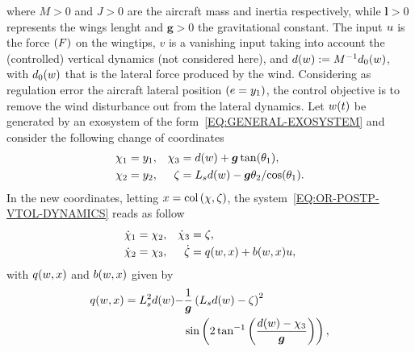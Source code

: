 where $M>0$ and $J>0$ are the aircraft mass and inertia respectively, while $\boldsymbol{l}>0$ represents the wings lenght and $\boldsymbol{g} > 0$ the
gravitational constant. The input $u$ is the force $\left( F \right)$ on the wingtips, $v$ is a vanishing input taking into
account the (controlled) vertical dynamics (not considered here), and $d(w) := M^{-1}d_0(w)$, with $d_0(w)$ that is
the lateral force produced by the wind. Considering as regulation error the aircraft lateral position $\left( e = y_1\right)$, the control
objective is to remove the wind disturbance out from the lateral dynamics.
Let $w(t)$ be generated by an exosystem of the form~\eqref{EQ:GENERAL-EXOSYSTEM} and consider the following change of coordinates
\begin{equation*}
   \begin{matrix}
      \begin{split}
        \chi_1 & = y_1, \\ \chi_2 & = y_2,
      \end{split} &
      \begin{split}
        \chi_3 & = d(w) + \boldsymbol{g} \tan(\theta_1), \\ \zeta & = L_s d(w) - {\boldsymbol{g} \theta_2}/{\cos(\theta_1)}.
      \end{split}
   \end{matrix}
\end{equation*}
In the new coordinates, letting $x = \text{col} \left( {\chi, \zeta} \right)$, the system~\eqref{EQ:OR-POSTP-VTOL-DYNAMICS} reads as follow
\begin{equation}%
   \label{EQ:OR-POSTP-NEW-VTOL-SYSTEM}
   \begin{matrix}
      \begin{split}
         \dot{\chi}_1 & = \chi_2, \\
         \dot{\chi}_2 & = \chi_3,
      \end{split} &
      \begin{split}
         \dot{\chi}_3 & = \zeta, \\
      \dot{\zeta} & = \qfun(\ww,\xx) + \bfun(\ww,\xx)\uu,
      \end{split}
   \end{matrix}
\end{equation}
with $q(w,x)$ and $b(w,x)$ given by
\begin{equation*}
   \begin{split}
      q(w,x) = L_s^2 d(w) - & \frac{1}{\boldsymbol{g}} \left( L_s d(w) - \zeta\right)^2 \\
      & \sin\left( 2 \tan^{-1}\left( \frac{d(w) - \chi_3}{\boldsymbol{g}}\right)\right),
   \end{split}
\end{equation*}
